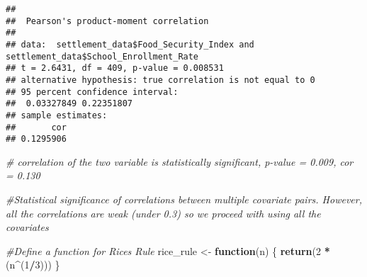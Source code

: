 \documentclass[
]{article}
\newenvironment{Shaded}{\begin{snugshade}}{\end{snugshade}}
\newcommand{\AttributeTok}[1]{\textcolor[rgb]{0.13,0.29,0.53}{#1}}
\newcommand{\CommentTok}[1]{\textcolor[rgb]{0.56,0.35,0.01}{\textit{#1}}}
\newcommand{\ControlFlowTok}[1]{\textcolor[rgb]{0.13,0.29,0.53}{\textbf{#1}}}
\newcommand{\DecValTok}[1]{\textcolor[rgb]{0.00,0.00,0.81}{#1}}
\newcommand{\FunctionTok}[1]{\textcolor[rgb]{0.13,0.29,0.53}{\textbf{#1}}}
\newcommand{\NormalTok}[1]{#1}
\newcommand{\OtherTok}[1]{\textcolor[rgb]{0.56,0.35,0.01}{#1}}
\newcommand{\SpecialCharTok}[1]{\textcolor[rgb]{0.81,0.36,0.00}{\textbf{#1}}}
\newcommand{\StringTok}[1]{\textcolor[rgb]{0.31,0.60,0.02}{#1}}
\begin{document}
\begin{verbatim}
## 
##  Pearson's product-moment correlation
## 
## data:  settlement_data$Food_Security_Index and settlement_data$School_Enrollment_Rate
## t = 2.6431, df = 409, p-value = 0.008531
## alternative hypothesis: true correlation is not equal to 0
## 95 percent confidence interval:
##  0.03327849 0.22351807
## sample estimates:
##       cor 
## 0.1295906
\end{verbatim}

\begin{Shaded}
\begin{Highlighting}[]
\CommentTok{\# correlation of the two variable is statistically significant, p{-}value = 0.009, cor = 0.130}

\CommentTok{\#Statistical significance of correlations between multiple covariate pairs. However, all the correlations are weak (under 0.3) so we proceed with using all the covariates}
\end{Highlighting}
\end{Shaded}

\begin{Shaded}
\begin{Highlighting}[]
\CommentTok{\#Define a function for Rice\textquotesingle{}s Rule}
\NormalTok{rice\_rule }\OtherTok{\textless{}{-}} \ControlFlowTok{function}\NormalTok{(n) \{}
  \FunctionTok{return}\NormalTok{(}\DecValTok{2} \SpecialCharTok{*}\NormalTok{ (n}\SpecialCharTok{\^{}}\NormalTok{(}\DecValTok{1}\SpecialCharTok{/}\DecValTok{3}\NormalTok{)))}
\NormalTok{\}}
\end{Highlighting}
\end{Shaded}

\begin{Shaded}
\end{Shaded}
\end{document}
